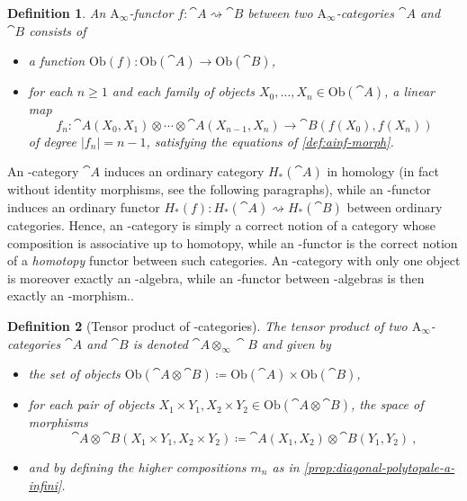 \documentclass[twoside, 12pt]{amsart}
\newtheorem{definition}{Definition}[section]
\theoremstyle{remark}
\begin{document}
\begin{definition}
An $\mathrm{A}_\infty$-functor $f : \cat{A} \rightsquigarrow \cat{B}$ between two $\mathrm{A}_\infty$-categories $\cat{A}$ and $\cat{B}$ consists of
\begin{itemize}[leftmargin=*]
\item a function $\mathrm{Ob}(f) : \mathrm{Ob}(\cat{A}) \to \mathrm{Ob}(\cat{B})$,
\item for each $n \geq 1$ and each family of objects $X_0, \ldots, X_n \in \mathrm{Ob}(\cat{A})$, a linear map \[f_n : \cat{A}(X_0,X_1) \otimes \cdots \otimes \cat{A}(X_{n-1},X_n) \to \cat{B}(f(X_0),f(X_n))\] of degree $|f_n|=n-1$, satisfying the equations of \cref{def:ainf-morph}.
\end{itemize}
\end{definition}

An \Ainf -category $\cat{A}$ induces an ordinary category $H_*(\cat{A})$ in homology (in fact without identity morphisms, see the following paragraphs), while an \Ainf -functor induces an ordinary functor $H_*(f) : H_*(\cat{A}) \rightsquigarrow H_*(\cat{B})$ between ordinary categories. Hence, an \Ainf -category is simply a correct notion of a category whose composition is associative up to homotopy, while an \Ainf -functor is the correct notion of a \emph{homotopy} functor between such categories.
An \Ainf -category with only one object is moreover exactly an \Ainf -algebra, while an \Ainf -functor between \Ainf -algebras is then exactly an \Ainf -morphism..

\begin{definition}[Tensor product of \Ainf -categories] \label{def:tensor-product-ainf-cat}
The \emph{tensor product} of two $\mathrm{A}_\infty$-categories $\cat{A}$ and $\cat{B}$ is denoted $\cat{A} \otimes_\infty \cat{B}$ and given by 
\begin{itemize}[leftmargin=*]
  \item the set of objects $\mathrm{Ob}(\cat{A}\otimes \cat{B})\coloneqq \mathrm{Ob}(\cat{A})\times\mathrm{Ob}(\cat{B})$,
  \item for each pair of objects $X_1\times Y_1,X_2\times Y_2 \in \mathrm{Ob}(\cat{A}\otimes \cat{B})$, the space of morphisms \[\cat{A}\otimes \cat{B}(X_1\times Y_1,X_2\times Y_2)\coloneqq \cat{A}(X_1,X_2)\otimes\cat{B}(Y_1,Y_2) \ , \]
  \item and by defining the higher compositions $m_n$ as in \cref{prop:diagonal-polytopale-a-infini}.
\end{itemize}
\end{definition}
\end{document}
